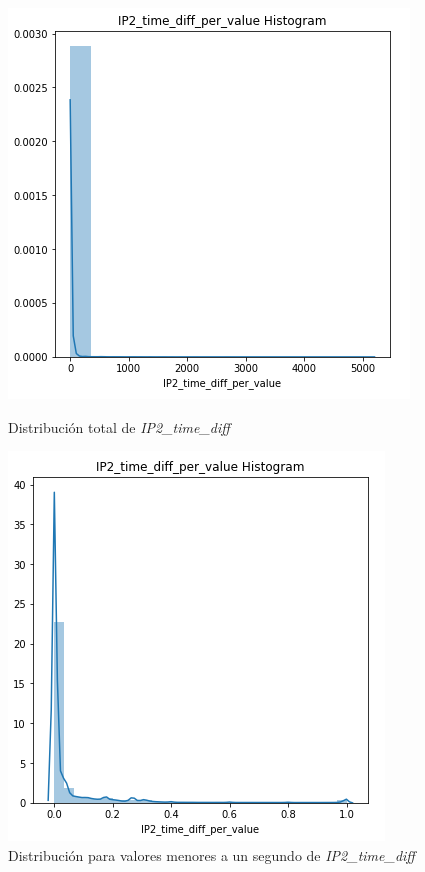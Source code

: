 \begin{figure}[H]
   \begin{minipage}{0.48\textwidth}
     \centering
     \includegraphics[width=0.8\linewidth]{figs/ip2diff_1.PNG}
     \caption{Distribución total de \textit{IP2\_time\_diff}}
     \label{Fig:ip2_diff1}
   \end{minipage}\hfill
   \begin{minipage}{0.48\textwidth}
     \centering
     \includegraphics[width=0.8\linewidth]{figs/ip2diff_2.PNG}
     \caption{Distribución para valores menores a un segundo de \textit{IP2\_time\_diff} }
     \label{Fig:ip2_diff2}
   \end{minipage}
\end{figure}

